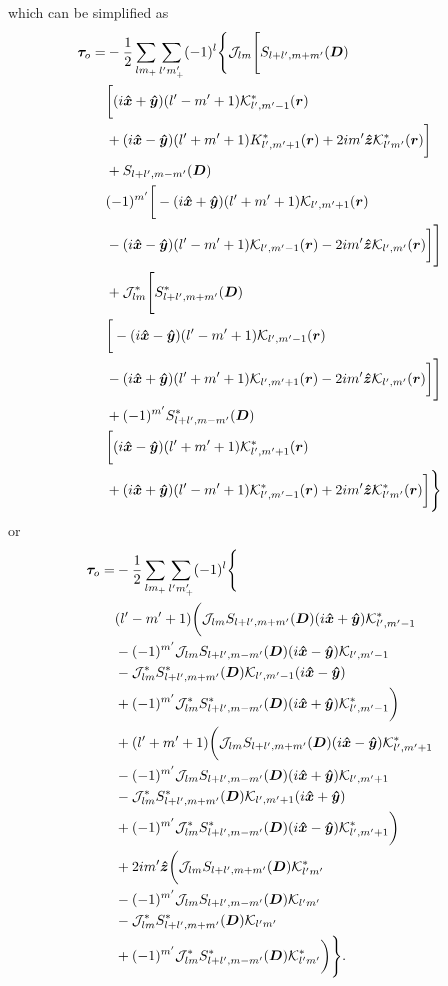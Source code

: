 \documentclass[aps,twocolumn,secnumarabic,balancelastpage,amsmath,amssymb,nofootinbib,floatfix]{revtex4-1}
\begin{document}
which can be simplified as
\begin{equation*}
\begin{aligned}
\bm \tau_o = &-\frac{1}{2}\sum_{lm_+}\sum_{l'm'_+}(-1)^l \Bigg\{\mathcal{J}_{lm} \Bigg[S_{l+l',m+m'}(\bm D) \\
&\bigg[(i\bm{\hat x} + \bm{\hat y})(l'-m'+1)\mathcal{K}^*_{l',m'-1}(\bm r)\\
&+(i\bm{\hat x}-\bm{\hat y})(l'+m'+1)K^*_{l',m'+1}(\bm r)+2im'\bm{\hat z} \mathcal{K}^*_{l'm'}(\bm r)\bigg]\\
&+S_{l+l',m-m'}(\bm D) \\
&(-1)^{m'}\bigg[-(i\bm{\hat x} + \bm{\hat y})(l'+m'+1)\mathcal{K}_{l',m'+1}(\bm r)\\
&-(i\bm{\hat x}-\bm{\hat y})(l'-m'+1)\mathcal{K}_{l',m'-1}(\bm r)-2im'\bm{\hat z} \mathcal{K}_{l',m'}(\bm r)\bigg]\Bigg]\\
&+\mathcal{J}_{lm}^*\Bigg[S^*_{l+l',m+m'}(\bm D) \\
&\bigg[-(i\bm{\hat x}-\bm{\hat y})(l'-m'+1)\mathcal{K}_{l',m'-1}(\bm r)\\
&-(i\bm{\hat x} + \bm{\hat y})(l'+m'+1)\mathcal{K}_{l',m'+1}(\bm r)-2im'\bm{\hat z} \mathcal{K}_{l',m'}(\bm r)\bigg]\Bigg]\\
&+(-1)^{m'}S^*_{l+l',m-m'}(\bm D) \\
&\bigg[(i\bm{\hat x}-\bm{\hat y})(l'+m'+1)\mathcal{K}^*_{l',m'+1}(\bm r)\\
&+(i\bm{\hat x} + \bm{\hat y})(l'-m'+1)\mathcal{K}^*_{l',m'-1}(\bm r)+2im'\bm{\hat z} \mathcal{K}^*_{l'm'}(\bm r)\bigg]\Bigg\}
\end{aligned}
\end{equation*}
or
\begin{equation*}
\begin{aligned}
\bm \tau_o = &-\frac{1}{2}\sum_{lm_+}\sum_{l'm'_+}(-1)^l\Bigg\{\\
&(l'-m'+1)\bigg(\mathcal{J}_{lm}S_{l+l',m+m'}(\bm D)(i\bm{\hat x} + \bm{\hat y})\mathcal{K}^*_{l',m'-1}\\
&-(-1)^{m'}\mathcal{J}_{lm}S_{l+l',m-m'}(\bm D)(i\bm{\hat x}-\bm{\hat y})\mathcal{K}_{l',m'-1}\\
&-\mathcal{J}_{lm}^*S^*_{l+l',m+m'}(\bm D)\mathcal{K}_{l',m'-1}(i\bm{\hat x}-\bm{\hat y})\\
&+(-1)^{m'}\mathcal{J}_{lm}^*S^*_{l+l',m-m'}(\bm D)(i\bm{\hat x} + \bm{\hat y})\mathcal{K}^*_{l',m'-1}\bigg)\\
&+(l'+m'+1)\bigg(\mathcal{J}_{lm}S_{l+l',m+m'}(\bm D)(i\bm{\hat x}-\bm{\hat y})\mathcal{K}^*_{l',m'+1}\\
&-(-1)^{m'}\mathcal{J}_{lm}S_{l+l',m-m'}(\bm D)(i\bm{\hat x} + \bm{\hat y})\mathcal{K}_{l',m'+1}\\
&-\mathcal{J}_{lm}^*S^*_{l+l',m+m'}(\bm D)\mathcal{K}_{l',m'+1}(i\bm{\hat x} + \bm{\hat y})\\
&+(-1)^{m'}\mathcal{J}_{lm}^*S^*_{l+l',m-m'}(\bm D)(i\bm{\hat x}-\bm{\hat y})\mathcal{K}^*_{l',m'+1}\bigg)\\
&+2im'\bm{\hat z}\bigg(\mathcal{J}_{lm}S_{l+l',m+m'}(\bm D)\mathcal{K}^*_{l'm'}\\
&-(-1)^{m'}\mathcal{J}_{lm}S_{l+l',m-m'}(\bm D)\mathcal{K}_{l'm'}\\
&-\mathcal{J}_{lm}^*S^*_{l+l',m+m'}(\bm D)\mathcal{K}_{l'm'}\\
&+(-1)^{m'}\mathcal{J}_{lm}^*S^*_{l+l',m-m'}(\bm D)\mathcal{K}^*_{l'm'}\bigg)\Bigg\}.
\end{aligned}
\end{equation*}
\end{document}
